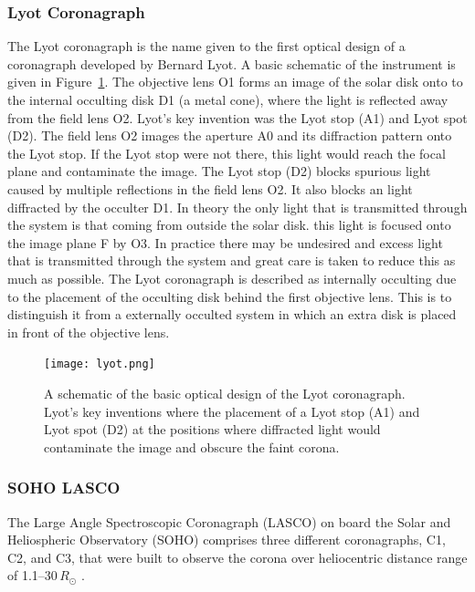 \subsubsection{Lyot Coronagraph}\label{sec:22}
The Lyot coronagraph is the name given to the first optical design of a coronagraph developed by Bernard Lyot. A basic schematic of the instrument is given in Figure~\ref{fig:lyot}. The objective lens O1 forms an image of the solar disk onto
to the internal occulting disk D1 (a metal cone), where the light is reflected away from the field lens O2. Lyot's key invention was the Lyot stop (A1) and Lyot spot (D2). The field lens O2 images the aperture A0 and its diffraction pattern onto the Lyot stop. If the Lyot stop were not there, this light would reach the focal plane and contaminate the image. The Lyot stop (D2) blocks spurious light caused by multiple reflections in the field lens O2. It also blocks an light diffracted by the occulter D1. In theory the only light that is transmitted through the system is that coming from outside the solar disk. this light is focused onto the image plane F by O3. In practice there may be undesired and excess light that is transmitted through the system and great care is taken to reduce this as much as possible. The Lyot coronagraph is described as internally occulting due to the placement of the occulting disk behind the first objective lens. This is to distinguish it from a externally occulted system in which an extra disk is placed in front of the objective lens.

\begin{figure}[!t]
\begin{center}
\texttt{[image: lyot.png]}
\caption[The Lyot coronagraph]{A schematic of the basic optical design of the Lyot coronagraph. Lyot's key inventions where the placement of a Lyot stop (A1) and Lyot spot (D2) at the positions where diffracted light would contaminate the image and obscure the faint corona.}
\label{fig:lyot}
\end{center}
\end{figure}

\subsubsection{SOHO LASCO}\label{sec:23}

The Large Angle Spectroscopic Coronagraph (LASCO) on board the Solar and Heliospheric Observatory (SOHO) comprises three different coronagraphs, C1, C2, and C3, that were built to observe the corona over heliocentric distance range of 1.1--30\,$R_{\odot}$ \citep{bru95}. 

